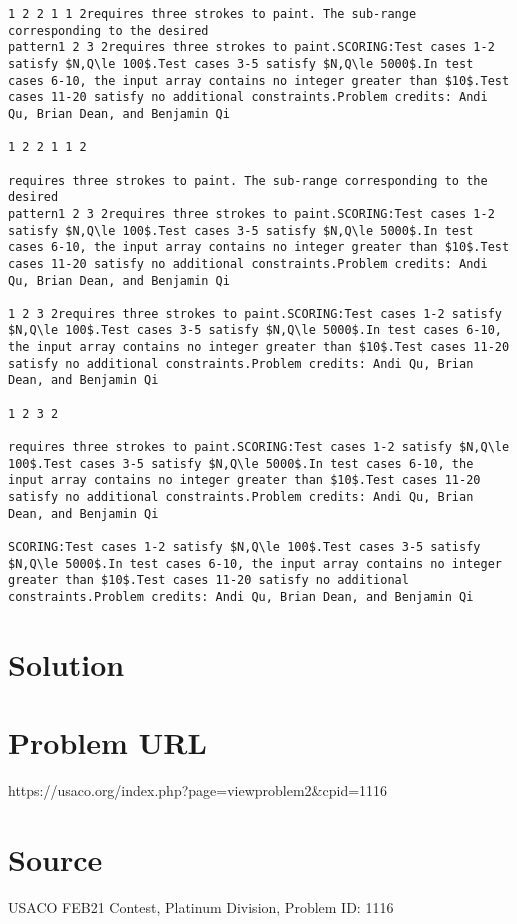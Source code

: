 \documentclass[12pt]{article}
\begin{document}
\begin{verbatim}
1 2 2 1 1 2requires three strokes to paint. The sub-range corresponding to the desired
pattern1 2 3 2requires three strokes to paint.SCORING:Test cases 1-2 satisfy $N,Q\le 100$.Test cases 3-5 satisfy $N,Q\le 5000$.In test cases 6-10, the input array contains no integer greater than $10$.Test cases 11-20 satisfy no additional constraints.Problem credits: Andi Qu, Brian Dean, and Benjamin Qi

1 2 2 1 1 2

requires three strokes to paint. The sub-range corresponding to the desired
pattern1 2 3 2requires three strokes to paint.SCORING:Test cases 1-2 satisfy $N,Q\le 100$.Test cases 3-5 satisfy $N,Q\le 5000$.In test cases 6-10, the input array contains no integer greater than $10$.Test cases 11-20 satisfy no additional constraints.Problem credits: Andi Qu, Brian Dean, and Benjamin Qi

1 2 3 2requires three strokes to paint.SCORING:Test cases 1-2 satisfy $N,Q\le 100$.Test cases 3-5 satisfy $N,Q\le 5000$.In test cases 6-10, the input array contains no integer greater than $10$.Test cases 11-20 satisfy no additional constraints.Problem credits: Andi Qu, Brian Dean, and Benjamin Qi

1 2 3 2

requires three strokes to paint.SCORING:Test cases 1-2 satisfy $N,Q\le 100$.Test cases 3-5 satisfy $N,Q\le 5000$.In test cases 6-10, the input array contains no integer greater than $10$.Test cases 11-20 satisfy no additional constraints.Problem credits: Andi Qu, Brian Dean, and Benjamin Qi

SCORING:Test cases 1-2 satisfy $N,Q\le 100$.Test cases 3-5 satisfy $N,Q\le 5000$.In test cases 6-10, the input array contains no integer greater than $10$.Test cases 11-20 satisfy no additional constraints.Problem credits: Andi Qu, Brian Dean, and Benjamin Qi
\end{verbatim}

\section*{Solution}


\section*{Problem URL}
https://usaco.org/index.php?page=viewproblem2&cpid=1116

\section*{Source}
USACO FEB21 Contest, Platinum Division, Problem ID: 1116
\end{document}
